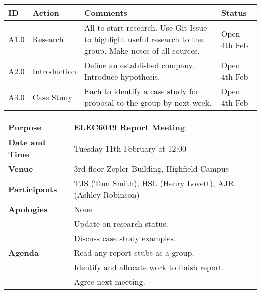 \documentclass{elec6049Report}     %
\begin{document}
\begin{center}
\begin{longtable}{| p{} | >{\raggedright\arraybackslash}p{} |  p{} | >{\raggedright\arraybackslash}p{}|} \hline
\textbf{ID} & \textbf{Action} & \textbf{Comments} & \textbf{Status} \\ \hline
\endhead
A1.0	&	Research	&	All to start research. Use Git Issue to highlight useful research to the group. Make notes of all sources.	& Open 4th Feb \\ \hline
A2.0	&	Introduction	&	Define an established company. Introduce hypothesis.	&	Open 4th Feb \\ \hline
A3.0	&	Case Study	&	Each to identify a case study for proposal to the group by next week.	&	Open 4th Feb	\\ \hline	
\end{longtable}
\end{center}



\begin{center}
\begin{longtable}{| m{} | m{} |} \hline
\textbf{Purpose} & ELEC6049 Report Meeting \\ \hline
\textbf{Date and Time} & Tuesday 11th February at 12:00 \\ \hline
\textbf{Venue} & 3rd floor Zepler Building, Highfield Campus \\ \hline
\textbf{Participants} & TJS (Tom Smith), HSL (Henry Lovett), AJR (Ashley Robinson)\\ \hline
\textbf{Apologies} & None \\ \hline
\multirow{5}{*}{\textbf{Agenda}} & Update on research status. \\
 & Discuss case study examples. \\ 
 & Read any report stubs as a group. \\
 & Identify and allocate work to finish report. \\ 
 & Agree next meeting. \\ \hline
\end{longtable}
\end{center}
\end{document}
